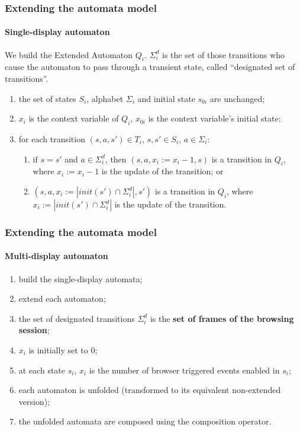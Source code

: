 \documentclass[usenames,dvipsnames]{beamer}
\theoremstyle{definition}
\begin{document}
\begin{frame}
  \frametitle{Extending the automata model}
  \framesubtitle{Single-display automaton}
  We build the Extended Automaton $Q_i$. $\Sigma^d_i$ is the set of those transitions who cause the automaton to pass through a transient state, called ``designated set of transitions''.

  \begin{enumerate}
    \item the set of states $S_i$, alphabet $\Sigma_i$ and initial state $s_{0i}$ are unchanged;
    \item $x_i$ is the context variable of $Q_i$, $x_{0i}$ is the context variable's initial state;
    \item for each transition $(s,a,s')\in T_i$, $s,s'\in S_i$, $a\in\Sigma_i$:
      \begin{enumerate}
        \item if $s=s'$ and $a\in\Sigma^d_i$, then $(s,a,x_i := x_i - 1,s)$ is a transition in $Q_i$, where $x_i := x_i - 1$ is the update of the transition; or
        \item $(s,a,x_i := |init(s')\cap \Sigma^d_i|,s')$ is a transition in $Q_i$, where $x_i := |init(s')\cap\Sigma^d_i|$ is the update of the transition.
      \end{enumerate}
  \end{enumerate}
\end{frame}


\begin{frame}
  \frametitle{Extending the automata model}
  \framesubtitle{Multi-display automaton}

  \begin{enumerate}
    \item build the single-display automata;
    \item extend each automaton;
    \item the set of designated transitions $\Sigma^d_i$ is the \textbf{set of frames of the browsing session};
    \item $x_i$ is initially set to 0;
    \item at each state $s_i$, $x_i$ is the number of browser triggered events enabled in $s_i$;
    \item each automaton is unfolded (transformed to its equivalent non-extended version);
    \item the unfolded automata are composed using the composition operator.
  \end{enumerate}
\end{frame}
\end{document}
